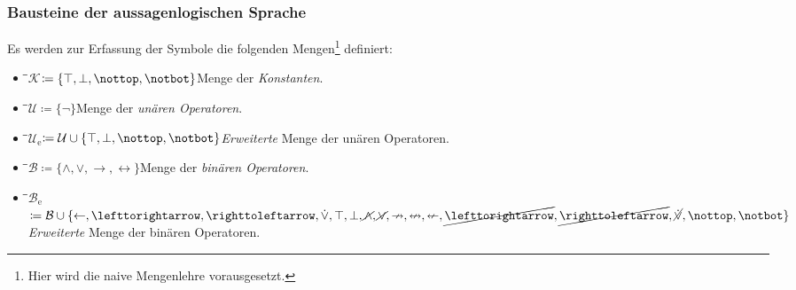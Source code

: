 \documentclass[english,ngerman,parskip=half,headsepline,footsepline]{scrreprt}
\newcommand*{\ltrue}{\top}      %
\newcommand*{\lnfalse}{\notbot} %
\newcommand*{\lfalse}{\bot}     %
\newcommand*{\lntrue}{\nottop}  %
\newcommand*{\lnxor}{\operatorname{\cancel{\lxor}}}     %
\newcommand*{\lleftimp}{\operatorname{\leftarrow}}      %
\newcommand*{\lleft}{\operatorname{\righttoleftarrow}}  %
\newcommand*{\limp}{\operatorname{\rightarrow}}         %
\newcommand*{\lright}{\operatorname{\lefttorightarrow}} %
\newcommand*{\lequiv}{\operatorname{\leftrightarrow}}   %
\newcommand*{\lnand}{\operatorname{\cancel{\land}}}     %
\newcommand*{\lnequiv}{\operatorname{\nleftrightarrow}} %
\newcommand*{\lxor}{\operatorname{\dot{\lor}}}          %
\newcommand*{\lnright}{\operatorname{\cancel{\lright}}} %
\newcommand*{\lnimp}{\operatorname{\nrightarrow}}       %
\newcommand*{\lnleft}{\operatorname{\cancel{\lleft}}}   %
\newcommand*{\lnleftimp}{\operatorname{\nleftarrow}}    %
\newcommand*{\lnor}{\operatorname{\cancel{\lor}}}       %
\newcommand*{\defeq}{\coloneqq}
\begin{document}
	{
		\subsubsection{Bausteine der aussagenlogischen Sprache}
		\label{subsub:Bausteine}

		\newcommand*{\ItemB}[4][]{\item[]\begin{tabbing}\hspace{0.7cm}\=\hspace{4.0cm}\=\kill#2\>#3\>#4#1\end{tabbing}}
		\newcommand*{\ItemF}[4][]{\item[]\begin{tabbing}\hspace{2.0cm}\=\hspace{4.5cm}\=\kill#2\>#3\>#4#1\end{tabbing}}

		\newcommand*{\asN}{\mathbb{N}_0}
		\newcommand*{\asK}{\mathcal{K}}
		\newcommand*{\asV}{\mathcal{V}}
		\newcommand*{\asU}{\mathcal{U}}
		\newcommand*{\asB}{\mathcal{B}}
		\newcommand*{\asG}{\mathcal{G}}
		\newcommand*{\asS}{\mathcal{J}}
		\newcommand*{\asA}{\mathcal{A}}
		\newcommand*{\asF}{\mathcal{F}}
		\newcommand*{\asX}{\mathcal{X}}
		\newcommand*{\ase}{_\mathrm{e}}
		\newcommand*{\asUe}{\asU\ase}
		\newcommand*{\asBe}{\asB\ase}
		\newcommand*{\asSe}{\asS\ase}
		\newcommand*{\asAe}{\asA\ase}
		\newcommand*{\asFe}{\asF\ase}
		\newcommand*{\asXe}{\asX\ase}

		Es werden zur Erfassung der Symbole die folgenden Mengen\footnote{Hier wird die naive Mengenlehre vorausgesetzt.} definiert:
		\begin{itemize}

			\ItemB{$\asK$}{$\defeq\{\ltrue,\lfalse,\lntrue,\lnfalse\}$}{Menge der \emph{Konstanten}.}

			\ItemB{$\asU$}{$\defeq\{\lnot\}$}{Menge der \emph{unären Operatoren}.}

			\ItemB{$\asUe$}{$\defeq\asU\cup\{\ltrue,\lfalse,\lntrue,\lnfalse\}$}{\emph{Erweiterte} Menge der unären Operatoren.}

			\ItemB{$\asB$}{$\defeq\{\land,\lor,\limp,\lequiv\}$}{Menge der \emph{binären Operatoren}.}

			\ItemB{$\asBe$}{$\defeq\asB\cup\{\lleftimp,\lright,\lleft,\lxor,\ltrue,\lfalse,\lnand,\lnor,\lnimp,\lnequiv,\lnleftimp,\lnright,\lnleft,\lnxor,\lntrue,\lnfalse\}$}{\\\>\>\emph{Erweiterte} Menge der binären Operatoren.}


\end{itemize}}
\end{document}
